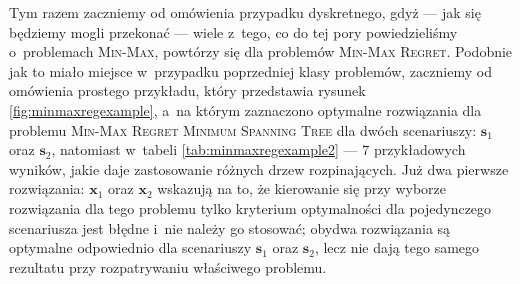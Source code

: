 Tym razem zaczniemy od omówienia przypadku dyskretnego, gdyż --- jak się będziemy mogli przekonać --- wiele z~tego, co do tej pory powiedzieliśmy o~problemach \textsc{Min-Max}, powtórzy się dla problemów \textsc{Min-Max Regret}.
Podobnie jak to miało miejsce w~przypadku poprzedniej klasy problemów, zaczniemy od omówienia prostego przykładu, który przedstawia rysunek \ref{fig:minmaxregexample}, a~na którym zaznaczono optymalne rozwiązania dla problemu \textsc{Min-Max Regret Minimum Spanning Tree} dla dwóch scenariuszy: $\textbf{s}_{1}$ oraz $\textbf{s}_{2}$, natomiast w~tabeli \ref{tab:minmaxregexample2} --- $7$ przykładowych wyników, jakie daje zastosowanie różnych drzew rozpinających.
Już dwa pierwsze rozwiązania: $\textbf{x}_{1}$ oraz $\textbf{x}_{2}$ wskazują na to, że kierowanie się przy wyborze rozwiązania dla tego problemu tylko kryterium optymalności dla pojedynczego scenariusza jest błędne i~nie należy go stosować; obydwa rozwiązania są optymalne odpowiednio dla scenariuszy $\textbf{s}_{1}$ oraz $\textbf{s}_{2}$, lecz nie dają tego samego rezultatu przy rozpatrywaniu właściwego problemu.

